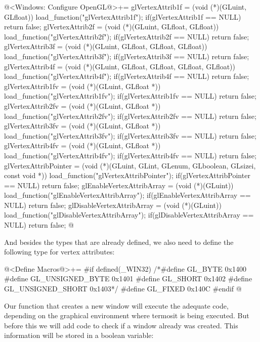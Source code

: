 \iniciocodigo
@<Windows: Configure OpenGL@>+=
glVertexAttrib1f = (void (*)(GLuint, GLfloat)) load_function("glVertexAttrib1f");
if(glVertexAttrib1f == NULL) return false;
glVertexAttrib2f = (void (*)(GLuint, GLfloat, GLfloat))
                      load_function("glVertexAttrib2f");
if(glVertexAttrib2f == NULL) return false;
glVertexAttrib3f = (void (*)(GLuint, GLfloat, GLfloat, GLfloat))
                      load_function("glVertexAttrib3f");
if(glVertexAttrib3f == NULL) return false;
glVertexAttrib4f = (void (*)(GLuint, GLfloat, GLfloat, GLfloat, GLfloat))
                      load_function("glVertexAttrib4f");
if(glVertexAttrib4f == NULL) return false;
glVertexAttrib1fv = (void (*)(GLuint, GLfloat *))
                       load_function("glVertexAttrib1fv");
if(glVertexAttrib1fv == NULL) return false;
glVertexAttrib2fv = (void (*)(GLuint, GLfloat *))
                       load_function("glVertexAttrib2fv");
if(glVertexAttrib2fv == NULL) return false;
glVertexAttrib3fv = (void (*)(GLuint, GLfloat *))
                       load_function("glVertexAttrib3fv");
if(glVertexAttrib3fv == NULL) return false;
glVertexAttrib4fv = (void (*)(GLuint, GLfloat *))
                       load_function("glVertexAttrib4fv");
if(glVertexAttrib4fv == NULL) return false;
glVertexAttribPointer = (void (*)(GLuint, GLint, GLenum, GLboolean,
                         GLsizei, const void *))
                              load_function("glVertexAttribPointer");
if(glVertexAttribPointer == NULL) return false;
glEnableVertexAttribArray = (void (*)(GLuint))
                              load_function("glEnableVertexAttribArray");
if(glEnableVertexAttribArray == NULL) return false;
glDisableVertexAttribArray = (void (*)(GLuint))
                               load_function("glDisableVertexAttribArray");
if(glDisableVertexAttribArray == NULL) return false;
@
\fimcodigo

And besides the types that are already defined, we also need to define
the following type for vertex attributes:

\iniciocodigo
@<Define Macros@>+=
#if defined(_WIN32)
/*#define GL_BYTE           0x1400
#define GL_UNSIGNED_BYTE  0x1401
#define GL_SHORT          0x1402
#define GL_UNSIGNED_SHORT 0x1403*/
#define GL_FIXED          0x140C
#endif
@
\fimcodigo



Our function that creates a new window will execute the adequate code,
depending on the graphical environment where termosit is being
executed. But before this we will add code to check if a window
already was created. This information will be stored in a boolean
variable:

